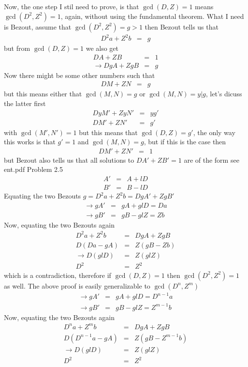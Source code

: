 \documentclass[aps,preprint,preprintnumbers,nofootinbib,showpacs,prd]{revtex4-1}
\newcommand{\nbea}{\begin{eqnarray*}}
\newcommand{\neea}{\end{eqnarray*}}
\begin{document}
Now, the one step I stil need to prove, is that $\gcd(D,Z) = 1$ means $\gcd(D^2,Z^2) = 1$, again, without using the fundamental theorem. What I need is Bezout, assume that $\gcd(D^2,Z^2) = g > 1$ then Bezout tells us that
%
\nbea
D^2 a + Z^2 b & = & g
\neea
%
but from $\gcd(D,Z)=1$ we also get
%
\nbea
D A + Z B & = & 1 \\
\to DgA + ZgB & = & g
\neea
%
Now there might be some other numbers such that
%
\nbea
D M + Z N & = & g
\neea
%
but this means either that $\gcd(M,N) = g$ or $\gcd(M,N) = y | g$, let's dicuss the latter first
%
\nbea
D y M' + Z y N' & = & yg' \\
D M' + Z N' & = & g'
\neea
%
with $\gcd(M',N') = 1$ but this means that $\gcd(D,Z) = g'$, the only way this works is that $g' = 1$ and $\gcd(M,N) = g$, but if this is the case then
%
\nbea
D M' + Z N' & = & 1
\neea
%
but Bezout also tells us that all solutions to $D A' + Z B' = 1$ are of the form see ent.pdf Problem 2.5
%
\nbea
A' & = & A + l D \\
B' & = & B - lD
\neea
%
Equating the two Bezouts $g = D^2 a + Z^2 b = DgA' + ZgB'$
%
\nbea
\to gA' & = & gA + gl D = Da\\
\to gB' & = & gB - gl Z = Zb 
\neea
%
Now, equating the two Bezouts again
%
\nbea
D^2 a + Z^2 b & = & DgA + ZgB \\
D(Da - gA) & = & Z(gB - Zb) \\
\to D(glD) & = & Z(glZ) \\
D^2 & = & Z^2
\neea
%
which is a contradiction, therefore if $\gcd(D,Z) = 1$ then $\gcd(D^2,Z^2) = 1$ as well. The above proof is easily generalizable to $\gcd(D^n,Z^m)$
%
\nbea
\to gA' & = & gA + gl D = D^{n-1}a\\
\to gB' & = & gB - gl Z = Z^{m-1}b 
\neea
%
Now, equating the two Bezouts again
%
\nbea
D^n a + Z^m b & = & DgA + ZgB \\
D(D^{n-1}a - gA) & = & Z(gB - Z^{m-1}b) \\
\to D(glD) & = & Z(glZ) \\
D^2 & = & Z^2
\neea
%
\end{document}
